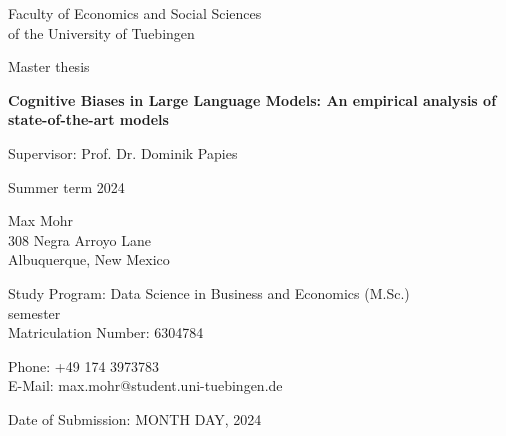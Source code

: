 \documentclass[12pt, a4paper, titlepage]{article}
\begin{document}
\begin{titlepage}
  \begin{center}
    Faculty of Economics and Social Sciences\\
    of the University of Tuebingen

    \vspace{3cm}

    Master thesis

    \vspace{1cm}

    {\Large\textbf{Cognitive Biases in Large Language Models: An empirical analysis of state-of-the-art models}}

    \vspace{0.5cm}

    Supervisor: Prof. Dr. Dominik Papies

    \vspace{0.5cm}

    Summer term 2024

  \end{center}

  \vfill

  \begin{multicols}{2}

    Max Mohr\\
    308 Negra Arroyo Lane\\
    Albuquerque, New Mexico

    \vfill

    Study Program: Data Science in Business and Economics (M.Sc.)\\
     semester\\
    Matriculation Number: 6304784
  \end{multicols}

  \begin{multicols}{2}
    Phone: +49 174 3973783\\
    E-Mail: max.mohr@student.uni-tuebingen.de\\

    \vfill

    Date of Submission: MONTH DAY, 2024

  \end{multicols}
\end{titlepage}


\newpage
{} %
\setcounter{page}{2}
\tableofcontents
\end{document}
